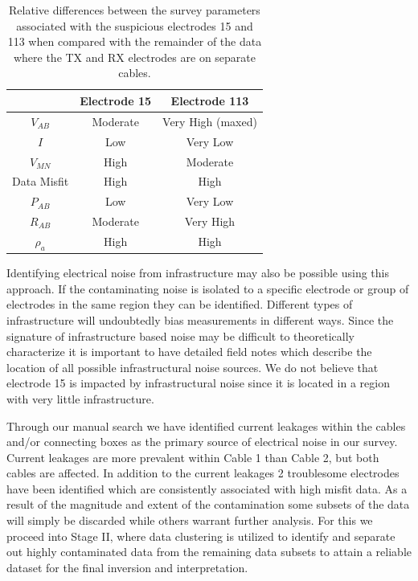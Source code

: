 \documentclass[final,authoryear,5p,times,twocolumn]{elsarticle}
\begin{document}
\begin{table}[!ht]
\begin{center}
  \begin{tabular}{| c | c | c |}
    \hline
     & Electrode 15 &  Electrode 113 \\ \hline
    $V_{AB}$ & Moderate & Very High (maxed) \\ 
    $I$ & Low & Very Low \\
    $V_{MN}$ & High & Moderate \\
    Data Misfit & High & High \\
    $P_{AB}$ &  Low & Very Low \\
    $R_{AB}$ & Moderate & Very High \\
    $\rho_{a}$ & High & High \\
    \hline
  \end{tabular}
\caption{Relative differences between the survey parameters associated with the suspicious electrodes 15 and 113 when compared with the remainder of the data where the TX and RX electrodes are on separate cables.}
\label{tab:BadElec_Props}
\end{center}
\end{table} 

Identifying electrical noise from infrastructure may also be possible using this approach. If the contaminating noise is isolated to a specific electrode or group of electrodes in the same region they can be identified. Different types of infrastructure will undoubtedly bias measurements in different ways. Since the signature of infrastructure based noise may be difficult to theoretically characterize it is important to have detailed field notes which describe the location of all possible infrastructural noise sources. We do not believe that electrode 15 is impacted by infrastructural noise since it is located in a region with very little infrastructure.  

Through our manual search we have identified current leakages within the cables and/or connecting boxes as the primary source of electrical noise in our survey. Current leakages are more prevalent within Cable 1 than Cable 2, but both cables are affected. In addition to the current leakages 2 troublesome electrodes have been identified which are consistently associated with high misfit data. As a result of the magnitude and extent of the contamination some subsets of the data will simply be discarded while others warrant further analysis. For this we proceed into Stage II, where data clustering is utilized to identify and separate out highly contaminated data from the remaining data subsets to attain a reliable dataset for the final inversion and interpretation. 
\end{document}
